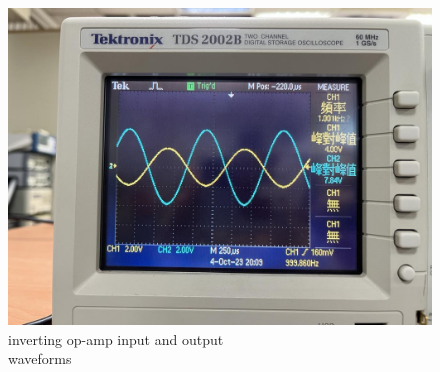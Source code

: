\documentclass{article}
\begin{document}
\begin{CJK*}{UTF8}{bkai}
\begin{minipage}{0.50\textwidth}
    \begin{figure}[H]
        \begin{center}   
            \includegraphics[scale=0.15]{inv_1k.jpg}
            \caption{inverting op-amp input and output \\waveforms}
        \end{center}
    \end{figure}    
\end{minipage}
\begin{minipage}{0.50\textwidth}
    \begin{figure}[H]
        \begin{center}   

\end{center}
\end{figure}
\end{minipage}
\end{CJK*}
\end{document}
